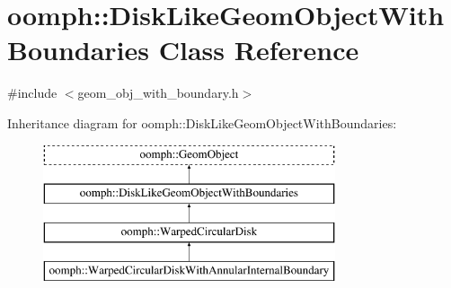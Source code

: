 \hypertarget{classoomph_1_1DiskLikeGeomObjectWithBoundaries}{}\section{oomph\+:\+:Disk\+Like\+Geom\+Object\+With\+Boundaries Class Reference}
\label{classoomph_1_1DiskLikeGeomObjectWithBoundaries}


{\ttfamily \#include $<$geom\+\_\+obj\+\_\+with\+\_\+boundary.\+h$>$}

Inheritance diagram for oomph\+:\+:Disk\+Like\+Geom\+Object\+With\+Boundaries\+:\begin{figure}[H]
\begin{center}
\leavevmode
\includegraphics[height=4.000000cm]{classoomph_1_1DiskLikeGeomObjectWithBoundaries}
\end{center}
\end{figure}
